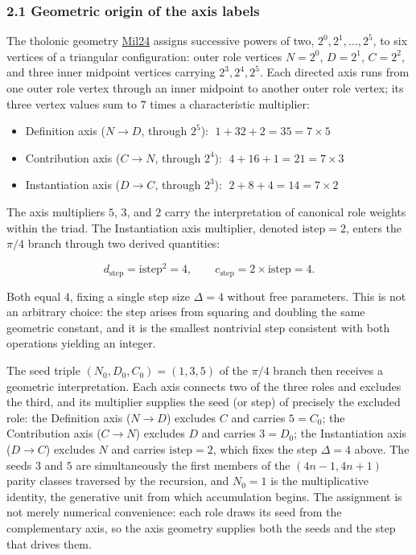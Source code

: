 \documentclass[
  11pt,
  letterpaper,
]{article}
\providecommand{\tightlist}{%
  \setlength{\itemsep}{0pt}\setlength{\parskip}{0pt}}
\begin{document}
\subsubsection{2.1 Geometric origin of the axis
labels}\label{geometric-origin-of-the-axis-labels}

The tholonic geometry \href{https://tholonia.github.io/the-book/}{Mil24}
assigns successive powers of two, \(2^0, 2^1, \ldots, 2^5\), to six
vertices of a triangular configuration: outer role vertices \(N = 2^0\),
\(D = 2^1\), \(C = 2^2\), and three inner midpoint vertices carrying
\(2^3, 2^4, 2^5\). Each directed axis runs from one outer role vertex
through an inner midpoint to another outer role vertex; its three vertex
values sum to \(7\) times a characteristic multiplier:

\begin{itemize}
\tightlist
\item
  Definition axis (\(N \to D\), through \(2^5\)):
  \(\;1 + 32 + 2 = 35 = 7 \times 5\)
\item
  Contribution axis (\(C \to N\), through \(2^4\)):
  \(\;4 + 16 + 1 = 21 = 7 \times 3\)
\item
  Instantiation axis (\(D \to C\), through \(2^3\)):
  \(\;2 + 8 + 4 = 14 = 7 \times 2\)
\end{itemize}

The axis multipliers \(5\), \(3\), and \(2\) carry the interpretation of
canonical role weights within the triad. The Instantiation axis
multiplier, denoted \(\mathrm{istep} = 2\), enters the \(\pi/4\) branch
through two derived quantities:

\[d_{\mathrm{step}} = \mathrm{istep}^2 = 4, \qquad c_{\mathrm{step}} = 2 \times \mathrm{istep} = 4.\]

Both equal \(4\), fixing a single step size \(\Delta = 4\) without free
parameters. This is not an arbitrary choice: the step arises from
squaring and doubling the same geometric constant, and it is the
smallest nontrivial step consistent with both operations yielding an
integer.

The seed triple \((N_0, D_0, C_0) = (1, 3, 5)\) of the \(\pi/4\) branch
then receives a geometric interpretation. Each axis connects two of the
three roles and excludes the third, and its multiplier supplies the seed
(or step) of precisely the excluded role: the Definition axis
(\(N \to D\)) excludes \(C\) and carries \(5 = C_0\); the Contribution
axis (\(C \to N\)) excludes \(D\) and carries \(3 = D_0\); the
Instantiation axis (\(D \to C\)) excludes \(N\) and carries
\(\mathrm{istep} = 2\), which fixes the step \(\Delta = 4\) above. The
seeds \(3\) and \(5\) are simultaneously the first members of the
\((4n-1, 4n+1)\) parity classes traversed by the recursion, and
\(N_0 = 1\) is the multiplicative identity, the generative unit from
which accumulation begins. The assignment is not merely numerical
convenience: each role draws its seed from the complementary axis, so
the axis geometry supplies both the seeds and the step that drives them.
\end{document}
